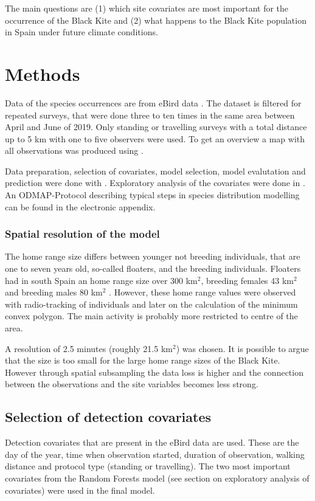 \begin{multicols}{2}
The main questions are (1) which site covariates are most important for the occurrence of the Black Kite and (2) what happens to the Black Kite population in Spain under future climate conditions.


\section{Methods}
Data of the species occurrences are from eBird data \parencite{Sullivan2009, ebirdData}. The dataset is filtered for repeated surveys, that were done three to ten times in the same area between April and June of 2019. Only standing or travelling surveys with a total distance up to 5 km with one to five observers were used. To get an overview a map with all observations was produced using \textcite{QGIS_software}.

Data preparation, selection of covariates, model selection, model evalutation and prediction were done with \textcite{R_lang}. Exploratory analysis of the covariates were done in \textcite{python}. An ODMAP-Protocol \parencite{Zurell2020} describing typical steps in species distribution modelling can be found in the electronic appendix.


\subsubsection*{Spatial resolution of the model}
The home range size differs between younger not breeding individuals, that are one to seven years old, so-called floaters, \parencite{Blas2009} and the breeding individuals. Floaters had in south Spain an home range size over 300 km$^2$, breeding females 43 km$^2$ and breeding males 80 km$^2$ \parencite{Tanferna2013}. However, these home range values were observed with radio-tracking of individuals and later on the calculation of the minimum convex polygon. The main activity is probably more restricted to centre of the area.

A resolution of 2.5 minutes (roughly 21.5 km$^2$) was chosen. It is possible to argue that the size is too small for the large home range sizes of the Black Kite. However through spatial subsampling the data loss is higher and the connection between the observations and the site variables becomes less strong.

\subsection*{Selection of detection covariates}
Detection covariates that are present in the eBird data are used. These are the day of the year, time when observation started, duration of observation, walking distance and protocol type (standing or travelling). The two most important covariates from the Random Forests model (see section on exploratory analysis of covariates) were used in the final model. 


\end{multicols}
